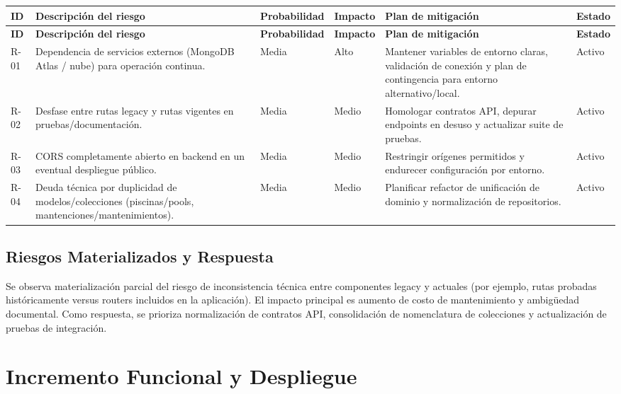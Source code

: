 \documentclass[11pt, a4paper]{article}
\begin{document}
\begin{longtable}{@{} p{1.2cm} p{5.8cm} p{1.8cm} p{1.6cm} p{2.8cm} p{2cm} @{}}
  \toprule
  \textbf{ID} & \textbf{Descripción del riesgo} & \textbf{Probabilidad} & \textbf{Impacto} & \textbf{Plan de mitigación} & \textbf{Estado} \\
  \midrule
  \endfirsthead
  \toprule
  \textbf{ID} & \textbf{Descripción del riesgo} & \textbf{Probabilidad} & \textbf{Impacto} & \textbf{Plan de mitigación} & \textbf{Estado} \\
  \midrule
  \endhead
  R-01 & Dependencia de servicios externos (MongoDB Atlas / nube) para operación continua. & Media   & Alto   & Mantener variables de entorno claras, validación de conexión y plan de contingencia para entorno alternativo/local. & \textcolor{accent}{Activo} \\
  R-02 & Desfase entre rutas legacy y rutas vigentes en pruebas/documentación.  & Media  & Medio   & Homologar contratos API, depurar endpoints en desuso y actualizar suite de pruebas.       & \textcolor{accent}{Activo} \\
  R-03 & CORS completamente abierto en backend en un eventual despliegue público.     & Media   & Medio  & Restringir orígenes permitidos y endurecer configuración por entorno.      & \textcolor{accent}{Activo} \\
  R-04 & Deuda técnica por duplicidad de modelos/colecciones (piscinas/pools, mantenciones/mantenimientos).          & Media  & Medio  & Planificar refactor de unificación de dominio y normalización de repositorios. & \textcolor{accent}{Activo} \\
  \bottomrule
\end{longtable}

\subsection{Riesgos Materializados y Respuesta}

Se observa materialización parcial del riesgo de inconsistencia técnica entre componentes legacy y actuales (por ejemplo, rutas probadas históricamente versus routers incluidos en la aplicación). El impacto principal es aumento de costo de mantenimiento y ambigüedad documental. Como respuesta, se prioriza normalización de contratos API, consolidación de nomenclatura de colecciones y actualización de pruebas de integración.

\section{Incremento Funcional y Despliegue}
\end{document}
